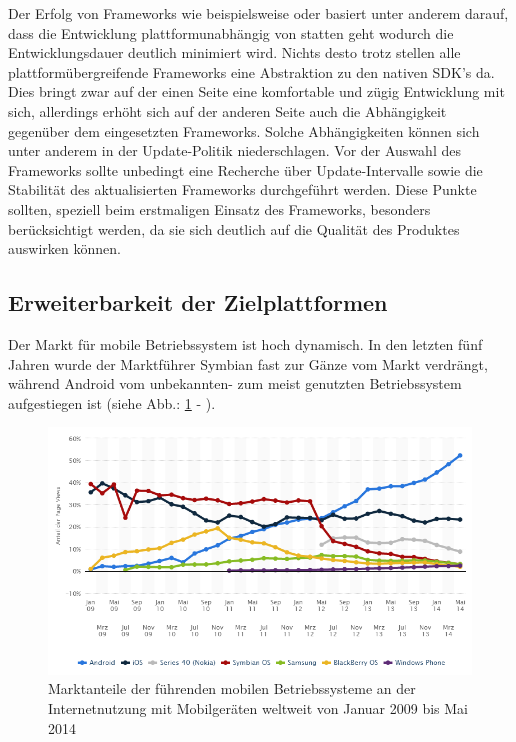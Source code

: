 \documentclass[Bachelorarbeit.tex]{subfiles}
\begin{document}
Der Erfolg von Frameworks wie beispielsweise  oder  basiert unter anderem darauf, dass die Entwicklung plattformunabhängig von statten geht wodurch die Entwicklungsdauer deutlich minimiert wird.
Nichts desto trotz stellen alle plattformübergreifende Frameworks eine Abstraktion zu den nativen \ac{SDK}'s da.
Dies bringt zwar auf der einen Seite eine komfortable und zügig Entwicklung mit sich, allerdings erhöht sich auf der anderen Seite auch die Abhängigkeit gegenüber dem eingesetzten Frameworks.
Solche Abhängigkeiten können sich unter anderem in der Update-Politik niederschlagen.
Vor der Auswahl des Frameworks sollte unbedingt eine Recherche über Update-Intervalle sowie die Stabilität des aktualisierten Frameworks durchgeführt werden.
Diese Punkte sollten, speziell beim erstmaligen Einsatz des Frameworks, besonders berücksichtigt werden, da sie sich deutlich auf die Qualität des Produktes auswirken können. 




\subsection*{Erweiterbarkeit der Zielplattformen}\label{sec:erweiterbarkeit-der-zielplattformen}

Der Markt für mobile Betriebssystem ist hoch dynamisch. 
In den letzten fünf Jahren wurde der Marktführer Symbian fast zur Gänze vom Markt verdrängt, während Android vom unbekannten- zum meist genutzten Betriebssystem aufgestiegen ist (siehe Abb.: \ref{fig:MarktanteilMobile} - ). 


\begin{figure}[h]
\centering
\includegraphics[width=0.9\linewidth]{./img/MarktanteilMobile}
\caption[Marktanteile der führenden mobilen Betriebssysteme]{Marktanteile der führenden mobilen Betriebssysteme an der Internetnutzung mit Mobilgeräten weltweit von Januar 2009 bis Mai 2014 \parencite[Quelle:][]{statistaMarktMobil}}
\label{fig:MarktanteilMobile}
\end{figure}
\end{document}
